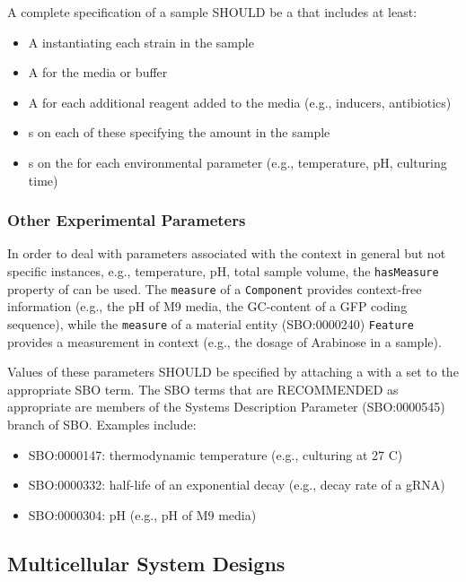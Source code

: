 A complete specification of a sample SHOULD be a  that includes at least:
\begin{itemize}
\item A  instantiating each strain in the sample
\item A  for the media or buffer
\item A  for each additional reagent added to the media (e.g., inducers, antibiotics)
\item {}s on each of these specifying the amount in the sample
\item {}s on the  for each environmental parameter (e.g., temperature, pH, culturing time)
\end{itemize}

\subsubsection{Other Experimental Parameters}

In order to deal with parameters associated with the context in general but not specific instances, e.g., temperature, pH, total sample volume, the \texttt{hasMeasure} property of  can be used.  The \texttt{measure} of a \texttt{Component} provides context-free information (e.g., the pH of M9 media, the GC-content of a GFP coding sequence), while the \texttt{measure} of a material entity (SBO:0000240) \texttt{Feature} provides a measurement in context (e.g., the dosage of Arabinose in a sample).

Values of these parameters SHOULD be specified by attaching a  with a  set to the appropriate SBO term. The SBO terms that are RECOMMENDED as appropriate are members of the Systems Description Parameter (SBO:0000545) branch of SBO. Examples include:
\begin{itemize}
\item SBO:0000147: thermodynamic temperature (e.g., culturing at 27 C)
\item SBO:0000332: half-life of an exponential decay (e.g., decay rate of a gRNA)
\item SBO:0000304: pH (e.g., pH of M9 media)
\end{itemize}


\subsection{Multicellular System Designs}

